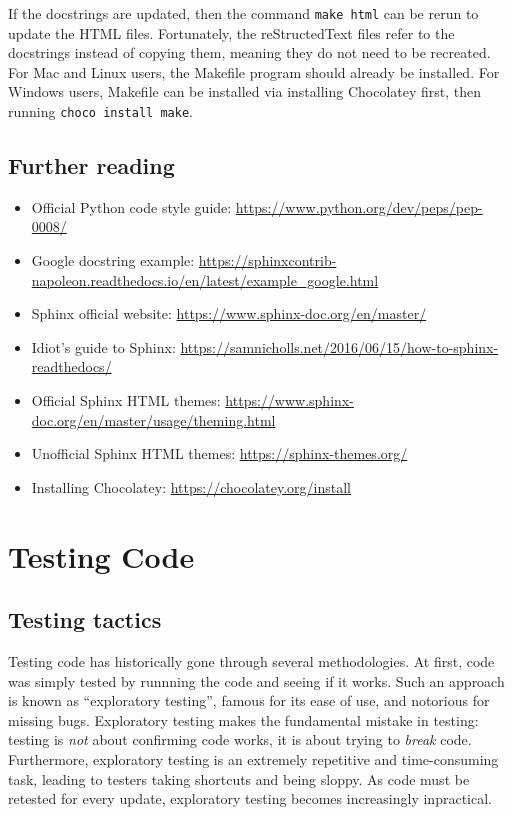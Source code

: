 \documentclass[11pt]{article}
\begin{document}
If the docstrings are updated, then the command \texttt{make html} can be rerun to update the HTML files. Fortunately, the reStructedText files refer to the docstrings instead of copying them, meaning they do not need to be recreated. For Mac and Linux users, the Makefile program should already be installed. For Windows users, Makefile can be installed via installing Chocolatey first, then running \texttt{choco install make}.

\subsection{Further reading}

\begin{itemize}
    \item Official Python code style guide: \url{https://www.python.org/dev/peps/pep-0008/}
    \item Google docstring example: \url{https://sphinxcontrib-napoleon.readthedocs.io/en/latest/example_google.html}
    \item Sphinx official website: \url{https://www.sphinx-doc.org/en/master/}
    \item Idiot's guide to Sphinx: \url{https://samnicholls.net/2016/06/15/how-to-sphinx-readthedocs/}
    \item Official Sphinx HTML themes: \url{https://www.sphinx-doc.org/en/master/usage/theming.html}
    \item Unofficial Sphinx HTML themes: \url{https://sphinx-themes.org/}
    \item Installing Chocolatey: \url{https://chocolatey.org/install}
\end{itemize}

\newpage

\section{Testing Code}

\subsection{Testing tactics}

Testing code has historically gone through several methodologies. At first, code was simply tested by runnning the code and seeing if it works. Such an approach is known as ``exploratory testing'', famous for its ease of use, and notorious for missing bugs. Exploratory testing makes the fundamental mistake in testing: testing is \textit{not} about confirming code works, it is about trying to \textit{break} code. Furthermore, exploratory testing is an extremely repetitive and time-consuming task, leading to testers taking shortcuts and being sloppy. As code must be retested for every update, exploratory testing becomes increasingly inpractical.
\end{document}

